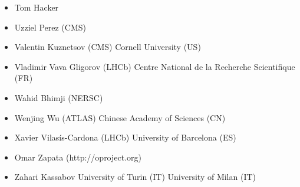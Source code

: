 \begin{itemize}
       \newline Universit{\'e} de Gen{\`e}ve (CH)
 \item Tom Hacker
 \item Uzziel Perez (CMS)
 \item Valentin Kuznetsov (CMS)
       \newline Cornell University (US)
 \item Vladimir Vava Gligorov (LHCb)
       \newline Centre National de la Recherche Scientifique (FR)
 \item Wahid Bhimji (NERSC)
 \item Wenjing Wu (ATLAS)
       \newline Chinese Academy of Sciences (CN)
 \item Xavier Vilasís-Cardona (LHCb)
       \newline University of Barcelona (ES)
 \item Omar Zapata (http://oproject.org)
 \item Zahari Kassabov
       \newline University of Turin (IT)
       \newline University of Milan (IT)
\end{itemize}
